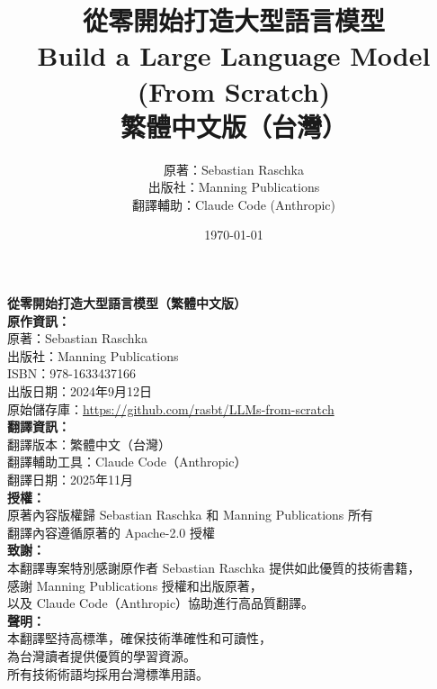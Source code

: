 \documentclass[12pt,a4paper,openany]{book}
\title{
    {\Huge\bfseries 從零開始打造大型語言模型}\\[1cm]
    {\Large Build a Large Language Model (From Scratch)}\\[0.5cm]
    {\large 繁體中文版（台灣）}
}
\author{
    {\large 原著：Sebastian Raschka}\\[0.3cm]
    {\normalsize 出版社：Manning Publications}\\[0.3cm]
    {\normalsize 翻譯輔助：Claude Code (Anthropic)}
}
\date{\today}
\begin{document}
\frontmatter
\maketitle

\newpage
\thispagestyle{empty}
\vspace*{\fill}
\begin{center}
\begin{minipage}{0.8\textwidth}
    \textbf{從零開始打造大型語言模型（繁體中文版）}\\[0.5cm]

    \textbf{原作資訊：}\\
    原著：Sebastian Raschka\\
    出版社：Manning Publications\\
    ISBN：978-1633437166\\
    出版日期：2024年9月12日\\
    原始儲存庫：\url{https://github.com/rasbt/LLMs-from-scratch}\\[0.5cm]

    \textbf{翻譯資訊：}\\
    翻譯版本：繁體中文（台灣）\\
    翻譯輔助工具：Claude Code（Anthropic）\\
    翻譯日期：2025年11月\\[0.5cm]

    \textbf{授權：}\\
    原著內容版權歸 Sebastian Raschka 和 Manning Publications 所有\\
    翻譯內容遵循原著的 Apache-2.0 授權\\[0.5cm]

    \textbf{致謝：}\\
    本翻譯專案特別感謝原作者 Sebastian Raschka 提供如此優質的技術書籍，\\
    感謝 Manning Publications 授權和出版原著，\\
    以及 Claude Code（Anthropic）協助進行高品質翻譯。\\[0.5cm]

    \textbf{聲明：}\\
    本翻譯堅持高標準，確保技術準確性和可讀性，\\
    為台灣讀者提供優質的學習資源。\\
    所有技術術語均採用台灣標準用語。
\end{minipage}
\end{center}
\vspace*{\fill}
\end{document}
